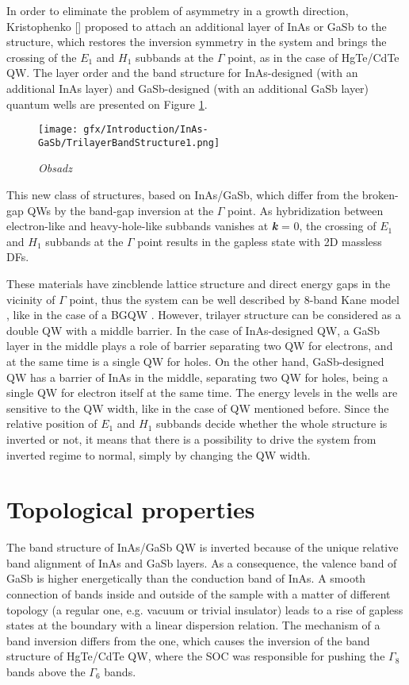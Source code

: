 \documentclass[titlepage,a4paper]{book}
\begin{document}
In order to eliminate the problem of asymmetry in a growth direction, Kristophenko [] proposed to attach an additional layer of InAs or GaSb to the structure, which restores the inversion symmetry in the system and brings the crossing of the $E_1$ and $H_1$ subbands at the $\Gamma$ point, as in the case of HgTe/CdTe QW. The layer order and the band structure for InAs-designed (with an additional InAs layer) and GaSb-designed (with an additional GaSb layer) quantum wells are presented on Figure \ref{fig:TrilayerBandStructure1}.

\begin{figure}[ht]
	\centering
	\texttt{[image: gfx/Introduction/InAs-GaSb/TrilayerBandStructure1.png]}
	\vspace{-10pt}
	\caption{\textit{Obsadz}}
	\label{fig:TrilayerBandStructure1}
\end{figure} 

This new class of structures, based on InAs/GaSb, which differ from the broken-gap QWs by the band-gap inversion at the $\Gamma$ point. As hybridization between electron-like and heavy-hole-like subbands vanishes at \textbf{\textit{k}} = 0, the crossing of $E_1$ and $H_1$ subbands at the $\Gamma$ point results in the gapless state with 2D massless DFs.

These materials have zincblende lattice structure and direct energy gaps in the vicinity of $\Gamma$ point, thus the system can be well described by 8-band Kane model \cite{Kane_Model}, like in the case of a BGQW \cite{Liu_Topology}. However, trilayer structure can be considered as a double QW with a middle barrier. In the case of InAs-designed QW, a GaSb layer in the middle plays a role of barrier separating two QW for electrons, and at the same time is a single QW for holes. On the other hand, GaSb-designed QW has a barrier of InAs in the middle, separating two QW for holes, being a single QW for electron itself at the same time. The energy levels in the wells are sensitive to the QW width, like in the case of QW mentioned before. Since the relative position of $E_1$ and $H_1$ subbands decide whether the whole structure is inverted or not, it means that there is a possibility to drive the system from inverted regime to normal, simply by changing the QW width.  

\section{Topological properties}
The band structure of InAs/GaSb QW is inverted because of the unique relative band alignment of InAs and GaSb layers. As a consequence, the valence band of GaSb is higher energetically than the conduction band of InAs. A smooth connection of bands inside and outside of the sample with a matter of different topology (a regular one, e.g. vacuum or trivial insulator) leads to a rise of gapless states at the boundary with a linear dispersion relation. The mechanism of a band inversion differs from the one, which causes the inversion of the band structure of HgTe/CdTe QW, where the SOC was responsible for pushing the $\Gamma_8$ bands above the $\Gamma_6$ bands. 
\end{document}
